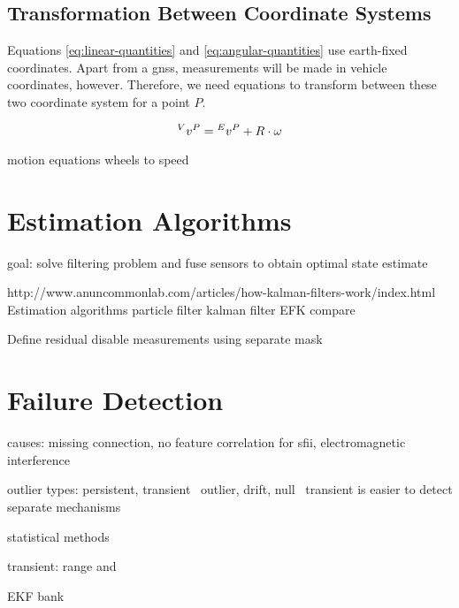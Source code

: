 \subsection{Transformation Between Coordinate Systems}
Equations \ref{eq:linear-quantities} and \ref{eq:angular-quantities} use earth-fixed coordinates. Apart from a \gls{gnss}, measurements will be made in vehicle coordinates, however. Therefore, we need equations to transform between these two coordinate system for a point $P$.

\begin{equation}%
\prescript{V}{}{v}^P = \prescript{E}{}{v}^P + R \cdot \omega%
\end{equation}




motion equations
wheels to speed



\section{Estimation Algorithms}
goal: solve filtering problem and fuse sensors to obtain optimal state estimate

http://www.anuncommonlab.com/articles/how-kalman-filters-work/index.html
Estimation algorithms
particle filter
kalman filter
EFK
compare

Define residual
disable measurements using separate mask



\section{Failure Detection}
causes: missing connection, no feature correlation for sfii, electromagnetic interference

outlier types: persistent, transient~\cite[p.~170~ff.]{Himmelblau.1994}
outlier, drift, null~\cite[p.~19 f.]{Kabzan.13.05.2019}
transient is easier to detect
separate mechanisms

statistical methods

transient: range and

EKF bank
